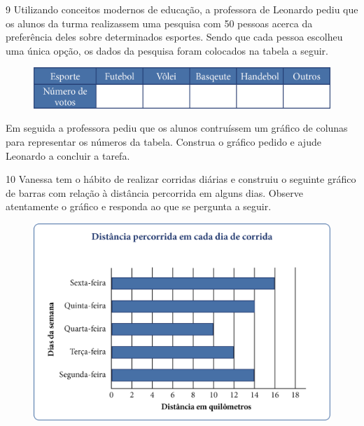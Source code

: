 \pagebreak
\num{9} Utilizando conceitos modernos de educação, a professora de Leonardo
pediu que os alunos da turma realizassem uma pesquisa com 50 pessoas acerca da
preferência deles sobre determinados esportes. Sendo que cada pessoa
escolheu uma única opção, os dados da pesquisa foram colocados na tabela
a seguir.

\begin{figure}[htpb!]
\centering
\includegraphics[width=\textwidth]{media/image48.png}
\end{figure}

Em seguida a professora pediu que os alunos contruíssem um gráfico de
colunas para representar os números da tabela. Construa o gráfico pedido
e ajude Leonardo a concluir a tarefa.

\begin{mdframed}[linewidth=2pt,linecolor=salmao,roundcorner=2pt]
\vspace{10cm}
\end{mdframed}

\num{10} Vanessa tem o hábito de realizar corridas diárias e construiu o seguinte
gráfico de barras com relação à distância percorrida em alguns dias. Observe atentamente o gráfico e responda ao que se pergunta a seguir.

\begin{figure}[htpb!]
\centering
\includegraphics[width=\textwidth]{media/image49.png}
\end{figure}

